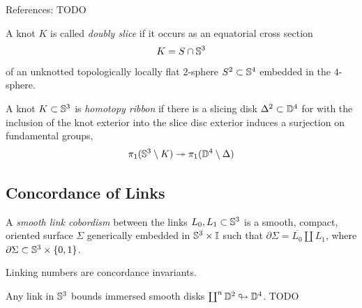 \begin{remark}
	References:
	\citep{57926}
	TODO
\end{remark}


\begin{definition}
	A knot $K$ is called \textit{doubly slice} 
	if it occurs as an
	equatorial cross section
	\[
		K = S \cap \mathbb{S}^{3}
	\]
	of an unknotted topologically locally flat
	$2$-sphere $S^{2} \subset \mathbb{S}^{4}$
	embedded in the $4$-sphere.
\end{definition}

\begin{definition}
	A knot $K \subset \mathbb{S}^{3}$ is \textit{homotopy ribbon} 
	if there is a slicing disk $\Delta^{2} \subset \mathbb{D}^{4}$
	for with the inclusion of the knot exterior into
	the slice disc exterior induces a surjection on fundamental groups,
	\begin{equation*}
		\pi_1( \mathbb{S}^{3} \setminus K )
		\twoheadrightarrow
		\pi_1( \mathbb{D}^{4} \setminus \Delta )
	\end{equation*}
\end{definition}


\subsection{Concordance of Links}

\begin{definition}
	A \textit{smooth link cobordism}  between the links
	$L_0, L_1 \subset \mathbb{S}^{3}$
	is a smooth, compact, oriented surface
	$\Sigma$ generically embedded in $\mathbb{S}^{3} \times \mathbb{I}$ such that
	$\partial \Sigma = \overline{L_{0}} \coprod L_{1}$,
	where $\partial \Sigma \subset \mathbb{S}^{3} \times \{0, 1\}$.
\end{definition}

\begin{proposition}
	Linking numbers are concordance invariants.
\end{proposition}

\begin{remark}
	Any link in $\mathbb{S}^{3}$ bounds immersed smooth disks
	$\coprod^{n} \mathbb{D}^{2} \looparrowright \mathbb{D}^{4}$.
	TODO
\end{remark}


